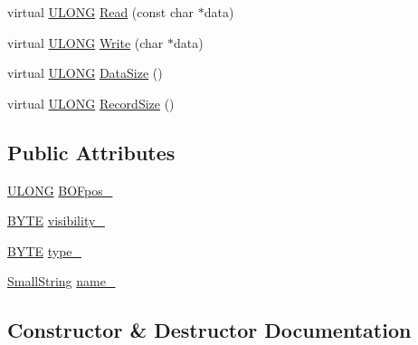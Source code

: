 \begin{DoxyCompactItemize}
\item 
virtual \hyperlink{_basic_excel_8hpp_abe09d1bea023be6a07cbadde8e955435}{U\+L\+O\+N\+G} \hyperlink{struct_y_excel_1_1_workbook_1_1_bound_sheet_adb930a36f5665c2a3a436c14316fab2f}{Read} (const char $\ast$data)
\item 
virtual \hyperlink{_basic_excel_8hpp_abe09d1bea023be6a07cbadde8e955435}{U\+L\+O\+N\+G} \hyperlink{struct_y_excel_1_1_workbook_1_1_bound_sheet_a63d4d314587ea5b4d06eb8ac3ffcd71b}{Write} (char $\ast$data)
\item 
virtual \hyperlink{_basic_excel_8hpp_abe09d1bea023be6a07cbadde8e955435}{U\+L\+O\+N\+G} \hyperlink{struct_y_excel_1_1_workbook_1_1_bound_sheet_a5284d8dd33f7549190af724c7ab1191c}{Data\+Size} ()
\item 
virtual \hyperlink{_basic_excel_8hpp_abe09d1bea023be6a07cbadde8e955435}{U\+L\+O\+N\+G} \hyperlink{struct_y_excel_1_1_workbook_1_1_bound_sheet_ab587844e84815a4108be2d487a468410}{Record\+Size} ()
\end{DoxyCompactItemize}
\subsection*{Public Attributes}
\begin{DoxyCompactItemize}
\item 
\hyperlink{_basic_excel_8hpp_abe09d1bea023be6a07cbadde8e955435}{U\+L\+O\+N\+G} \hyperlink{struct_y_excel_1_1_workbook_1_1_bound_sheet_acef056c4060806736aeb519580b50342}{B\+O\+Fpos\+\_\+}
\item 
\hyperlink{_basic_excel_8hpp_a4ae1dab0fb4b072a66584546209e7d58}{B\+Y\+T\+E} \hyperlink{struct_y_excel_1_1_workbook_1_1_bound_sheet_ae59ccb1998e05fb32b4df9217144b8bd}{visibility\+\_\+}
\item 
\hyperlink{_basic_excel_8hpp_a4ae1dab0fb4b072a66584546209e7d58}{B\+Y\+T\+E} \hyperlink{struct_y_excel_1_1_workbook_1_1_bound_sheet_a6e7b56ac49d75d6d38ad98794925ada4}{type\+\_\+}
\item 
\hyperlink{struct_y_excel_1_1_small_string}{Small\+String} \hyperlink{struct_y_excel_1_1_workbook_1_1_bound_sheet_aad8f841da0db30cf1981b0ec84c71f63}{name\+\_\+}
\end{DoxyCompactItemize}


\subsection{Constructor \& Destructor Documentation}
\hypertarget{struct_y_excel_1_1_workbook_1_1_bound_sheet_a0098cd604c12d16daebd2457c1755b85}{}
